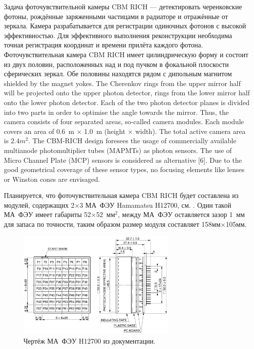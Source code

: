 Задача фоточувствительной камеры CBM RICH --- детектировать черенковские фотоны, рождённые заряженными частицами в радиаторе и отражённые от зеркала. Камера разрабатывается для регистрации одиночных фотонов с высокой эффективностью. Для эффективного выполнения реконструкции необходима точная регистрация координат и времени прилёта каждого фотона.
Фоточувствительная камера CBM RICH имеет цилиндрическую форму и состоит из двух половин, расположенных над и под пучком в фокальной плоскости сферических зеркал. Обе половины находятся рядом с дипольным магнитом
shielded by the magnet yokes. The Cherenkov rings from the upper mirror half will be projected onto the upper photon detector, rings from the lower mirror half onto the lower photon detector. Each of the two photon detector planes is divided into two parts in order to optimise the angle towards the mirror. Thus, the camera consists of four separated areas, so-called camera modules. Each module covers an area of 0.6~m $\times$ 1.0~m (height $\times$ width). The total active camera area is $2.4 m^{2}$.
The CBM-RICH design foresees the usage of commercially available multianode photomultiplier tubes (MAPMTs) as photon sensors. The use of Micro Channel Plate (MCP) sensors is considered as alternative [6]. Due to the good geometrical coverage of these sensor types, no focusing elements like lenses or Winston cones are envisaged.


Планируется, что фоточувствительная камера CBM RICH будет составлена из модулей, содержащих 2$\times$3 МА~ФЭУ Hamamatsu H12700, см. . Один такой МА~ФЭУ имеет габариты 52$\times$52~мм$^2$, между МА~ФЭУ оставляется зазор 1~мм для запаса по точности, таким образом размер модуля составляет 158мм$\times$105мм.

\begin{figure}[H]
\centering
\includegraphics[width=0.7\textwidth]{pictures/H12700_drawing.png}
\caption{Чертёж МА~ФЭУ H12700 из документации.}
\label{fig:H12700drawing}
\end{figure}

